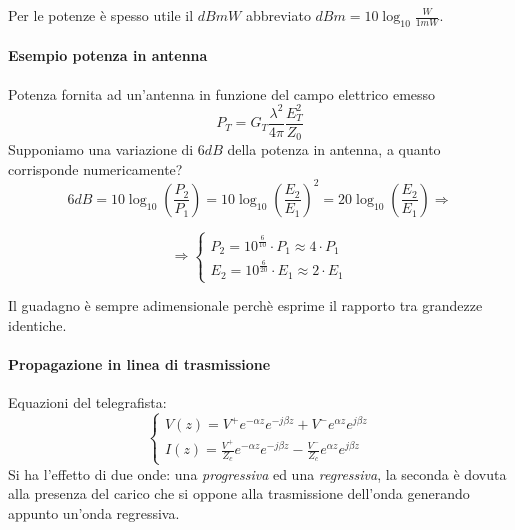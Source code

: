 Per le potenze è spesso utile il $\si{dB}mW $ abbreviato $\si{dB}m = 10\log_{10}\frac{W}{1 mW}$.

\paragraph{Esempio potenza in antenna}
Potenza fornita ad un'antenna in funzione del campo elettrico emesso
$$P_T = G_T \frac{\lambda^2}{4\pi}\frac{E_T^2}{Z_0}$$
Supponiamo una variazione di $6 \si{dB}$ della potenza in antenna, a quanto corrisponde numericamente?
$$6\si{dB} = 10\log_{10}\left(\frac{P_2}{P_1} \right) = 10\log_{10}\left(\frac{E_2}{E_1}\right)^2 =
20\log_{10}\left(\frac{E_2}{E_1}\right) \Rightarrow$$

$$\Rightarrow
\begin{cases}
 P_2 = 10^{\frac{6}{10}}\cdot P_1 \approx 4\cdot P_1 \\
 E_2 = 10^{\frac{6}{20}}\cdot E_1 \approx 2\cdot E_1
\end{cases}
$$

Il guadagno è sempre adimensionale perchè esprime il rapporto tra grandezze identiche.

\paragraph{Propagazione in linea di trasmissione}
Equazioni del telegrafista:
$$
\begin{cases}
 V(z) = V^+e^{-\alpha z} e^{-j\beta z} + V^-e^{\alpha z}e^{j\beta z}  \\
 I(z) = \frac{V^+}{Z_c}e^{-\alpha z} e^{-j\beta z} - \frac{V^-}{Z_c}e^{\alpha z}e^{j\beta z}
\end{cases}
$$
Si ha l'effetto di due onde: una \textit{progressiva} ed una \textit{regressiva}, la seconda è dovuta alla
presenza del carico che si oppone alla trasmissione dell'onda generando appunto un'onda regressiva.


